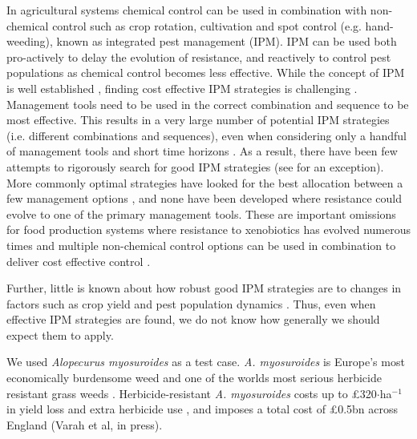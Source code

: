 \documentclass[9pt,twocolumn,twoside,lineno]{pnas-new}
\begin{document}
In agricultural systems chemical control can be used in combination with non-chemical control such as crop rotation, cultivation and spot control (e.g. hand-weeding), known as integrated pest management (IPM). IPM can be used both pro-actively to delay the evolution of resistance, and reactively to control pest populations as chemical control becomes less effective. While the concept of IPM is well established \citep{Bott1979}, finding cost effective IPM strategies is challenging \citep{Dana2014, Chal2015}. Management tools need to be used in the correct combination and sequence to be most effective. This results in a very large number of potential IPM strategies (i.e. different combinations and sequences), even when considering only a handful of management tools and short time horizons \citep{Chal2015}. As a result, there have been few attempts to rigorously search for good IPM strategies (see \citealp{Chal2015} for an exception). More commonly optimal strategies have looked for the best allocation between a few management options \citep{EpanN2010, Meis2016, Okum2016, Buyu2017}, and none have been developed where resistance could evolve to one of the primary management tools. These are important omissions for food production systems where resistance to xenobiotics has evolved numerous times \citep{Denh1992, Palu2001} and multiple non-chemical control options can be used in combination to deliver cost effective control \citep{Chal2015}.

Further, little is known about how robust good IPM strategies are to changes in factors such as crop yield and pest population dynamics \citep{EpanN2010}. Thus, even when effective IPM strategies are found, we do not know how generally we should expect them to apply.

We used \textit{Alopecurus myosuroides} as a test case. \textit{A. myosuroides} is Europe's most economically burdensome weed \citep{Moss2007} and one of the worlds most serious herbicide resistant grass weeds \citep{Heap2014}. Herbicide-resistant \textit{A. myosuroides} costs up to \pounds 320$\cdot$ha$^{-1}$ in yield loss and extra herbicide use \citep{Hick2018}, and imposes a total cost of \pounds 0.5bn across England (Varah et al, in press).     
\end{document}
